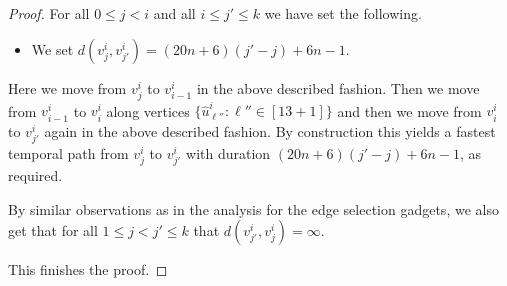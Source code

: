 \documentclass[a4paper,UKenglish,cleveref, autoref, thm-restate, anonymous]{lipics-v2021}
\begin{document}
\begin{proof}
For all $0\le j<i$ and all $i\le j'\le k$ we have set the following.
\begin{itemize}
    \item We set $d(v^i_j,v^i_{j'})=(20n+6)(j'-j)+6n-1$.
\end{itemize}
Here we move from $v^i_j$ to $v^i_{i-1}$ in the above described fashion. Then we move from $v^i_{i-1}$ to $v^i_i$ along vertices $\{\hat{u}^i_{\ell''} :  \ell''\in[13+1]\}$ and then we move from $v^i_i$ to $v^i_{j'}$ again in the above described fashion. By construction this yields a fastest temporal path from $v^i_j$ to $v^i_{j'}$ with duration $(20n+6)(j'-j)+6n-1$, as required.

By similar observations as in the analysis for the edge selection gadgets, we also get that for all $1\le j<j'\le k$ that $d(v^i_{j'},v^i_j)=\infty$.

This finishes the proof.





\end{proof}
\end{document}
